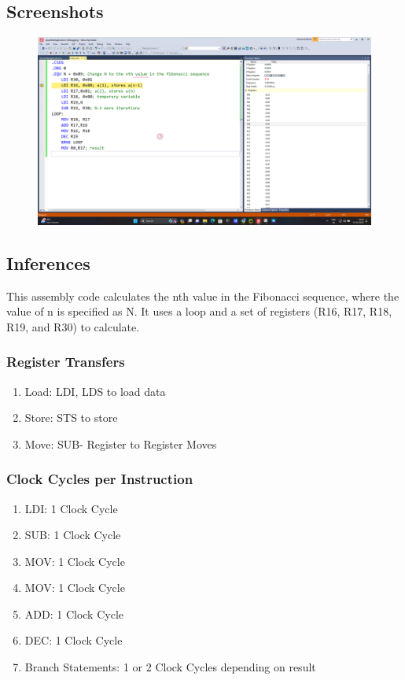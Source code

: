 \documentclass[titlepage, 11pt]{article}
\begin{document}
{\renewcommand\fcolorbox[4][]{\textcolor{black}{\strut#4}}
\inputminted[breaklines,
 mathescape,
 linenos,
 numbersep=5pt,
 frame=single,
 numbersep=5pt,
 xleftmargin=0pt]{asm}{"Prob5.asm"}}

\subsection{Screenshots}
\begin{figure}[H]
  \centering
  \includegraphics[width=1\linewidth]{prob5.png}
\end{figure}

\subsection{Inferences}
This assembly code calculates the nth value in the Fibonacci sequence, where the value of n is specified as N. It uses a loop and a set of registers (R16, R17, R18, R19, and R30) to calculate.

\subsubsection{Register Transfers}
\begin{enumerate}
\item Load: LDI, LDS to load data
\item Store: STS to store
\item Move: SUB- Register to Register Moves
\end{enumerate}

\subsubsection{Clock Cycles per Instruction}
\begin{enumerate}
\item LDI: 1 Clock Cycle
\item SUB: 1 Clock Cycle
\item MOV: 1 Clock Cycle
\item MOV: 1 Clock Cycle
\item ADD: 1 Clock Cycle
\item DEC: 1 Clock Cycle
\item Branch Statements: 1 or 2 Clock Cycles depending on result
\end{enumerate}
\end{document}
